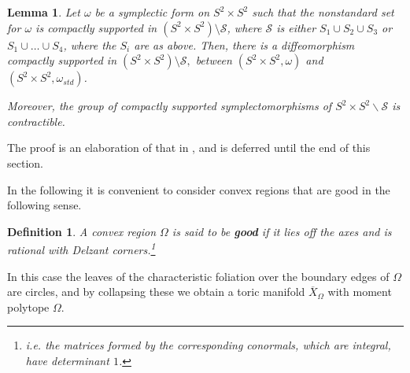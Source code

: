 \documentclass[11pt, reqno]{amsart}
\newtheorem{lemma}[thm]{Lemma}
\newtheorem{definition}[thm]{Definition}
\theoremstyle{remark}
\numberwithin{equation}{subsection}
\numberwithin{figure}{section}
\theoremstyle{customremark}
\newcommand{\Ss}{{\mathcal S}}
\newcommand{\ov}{\overline}
\newcommand{\Om}{{\Omega}}
\newcommand{\om}{{\omega}}
\newcommand{\less} {{\smallsetminus}}
\newcommand{\MS}{{\medskip}}
\begin{document}
\begin{lemma} 
\label{lem:s2s2}
Let $\om$ be a symplectic form on $S^2 \times S^2$ such that the nonstandard set for $\omega$ is compactly supported in $(S^2 \times S^2) \setminus \Ss$, where $\Ss$ is either $S_1  \cup S_2\cup S_3$ or $S_1\cup\ldots \cup S_4$, where the $S_i$ are as above.  Then, there is a
diffeomorphism
compactly supported in $(S^2 \times S^2) \setminus \Ss,$ between  $(S^2 \times S^2, \omega)$ and $(S^2 \times S^2, \om_{std} )$.

Moreover, the group of  compactly supported symplectomorphisms of  $S^2\times S^2\less \Ss$ is  contractible.
\end{lemma}

The proof is an elaboration of that in \cite[Ch.9.4]{JHOL}, and is deferred until the end of this section.
\MS

In the following it is convenient to consider convex regions that are good in the following sense.

\begin{definition}\label{def:good}  A convex region $\Om$ is said to be {\bf good} if it lies off the axes and  is rational with
 Delzant corners.\footnote{
i.e. the matrices formed by the corresponding conormals, which are integral, have determinant $1$.}
 \end{definition}
 
  In this case 
the leaves of the characteristic foliation over the boundary edges of $\Om$ are circles, and by collapsing these we obtain a toric manifold $\ov{X}_{\Om}$ with moment polytope $\Om$.

\MS
\end{document}
